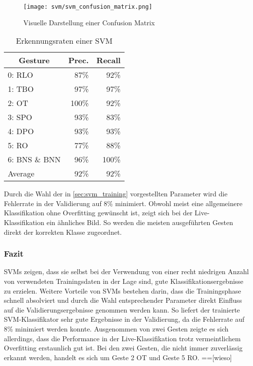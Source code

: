 \begin{figure}[htbp] \centering
    \texttt{[image: svm/svm\_confusion\_matrix.png]}
    \caption{Visuelle Darstellung einer Confusion Matrix}
    \label{fig:svm_confusion_matrix}
\end{figure}

\begin{table}[h]
\centering
\begin{tabular}{lrr}
\hline
 \multicolumn{1}{c}{\textbf{Gesture}} & \multicolumn{1}{c}{\textbf{Prec.}} & \multicolumn{1}{c}{\textbf{Recall}} \\
 \hline
  0: \ac{RLO} & 87\% & 92\% \\
 \hline
  1: \ac{TBO} & 97\% & 97\% \\
 \hline
  2: \ac{OT} & 100\% & 92\% \\
 \hline
  3: \ac{SPO} & 93\% & 83\% \\
 \hline
  4: \ac{DPO} & 93\% & 93\% \\
 \hline
  5: \ac{RO} & 77\% & 88\% \\
 \hline
  6: \ac{BNS} \& \ac{BNN} & 96\% & 100\% \\
 \hline
  Average & 92\% & 92\% \\
 \hline
\end{tabular}
\caption[Erkennungsraten einer SVM]{Erkennungsraten einer SVM}
\label{tab:svm_performance}
\end{table}

Durch die Wahl der in \autoref{sec:svm_training} vorgestellten Parameter wird die Fehlerrate in der Validierung auf 8\% minimiert.
Obwohl meist eine allgemeinere Klassifikation ohne Overfitting gewünscht ist, zeigt sich bei der Live-Klassifikation ein ähnliches Bild.
So werden die meisten ausgeführten Gesten direkt der korrekten Klasse zugeordnet.


\subsubsection{Fazit}\label{sec:svm_conclusion}
\ac{SVM}s zeigen, dass sie selbst bei der Verwendung von einer recht niedrigen Anzahl von verwendeten Trainingsdaten in der Lage sind, gute Klassifikationsergebnisse zu erzielen.
Weitere Vorteile von \ac{SVM}s bestehen darin, dass die Trainingsphase schnell absolviert und durch die Wahl entsprechender Parameter direkt Einfluss auf die Validierungsergebnisse genommen werden kann.
So liefert der trainierte \ac{SVM}-Klassifikator sehr gute Ergebnisse in der Validierung, da die Fehlerrate auf 8\% minimiert werden konnte.
Ausgenommen von zwei Gesten zeigte es sich allerdings, dass die Performance in der Live-Klassifikation trotz vermeintlichem Overfitting erstaunlich gut ist.
Bei den zwei Gesten, die nicht immer zuverlässig erkannt werden, handelt es sich um Geste 2 \ac{OT} und Geste 5 \ac{RO}.
==[wieso]

